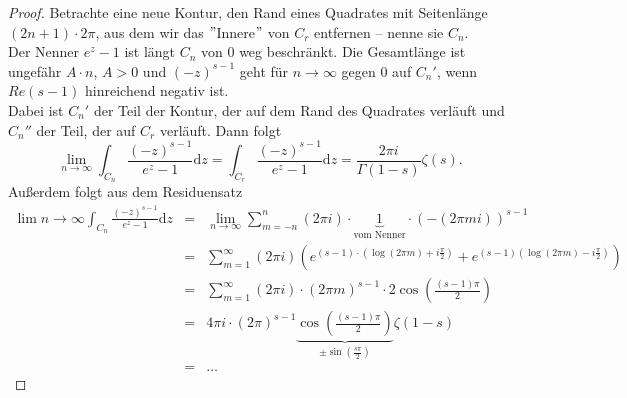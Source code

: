\documentclass[11pt,titlepage]{article}
\theoremstyle{definition}
\theoremstyle{remark}
\begin{document}
	\begin{proof}
		Betrachte eine neue Kontur, den Rand eines Quadrates mit Seitenlänge $(2n+1)\cdot 2\pi$, aus dem wir 
		das $"$Innere$"$ von $C_r$ entfernen – nenne sie $C_n$. \\
		Der Nenner $e^z -1$ ist längt $C_n$ von $0$ weg beschränkt. Die Gesamtlänge ist ungefähr 
		$A\cdot n$, $A>0$ und $(-z)^{s-1}$ geht für $n\to \infty$ gegen $0$ auf $C_n'$, wenn $Re(s-1)$ hinreichend 
		negativ ist. \\
		Dabei ist $C_n'$ der Teil der Kontur, der auf dem Rand des Quadrates verläuft und $C_n''$ der Teil, der 
		auf $C_r$ verläuft. Dann folgt
		\[\lim_{n\to\infty}\int_{C_n}\frac{(-z)^{s-1}}{e^z -1}\mathrm{d}z = \int_{C_r} \frac{ (-z)^{s-1}}{e^z -1}\mathrm{d}
		z = \frac{2\pi i}{\Gamma(1-s)}\zeta(s). \]
		Außerdem folgt aus dem Residuensatz
		\begin{eqnarray*}
			\lim{n\to\infty}\int_{C_n} \frac{(-z)^{s-1}}{e^z -1}\mathrm{d}z &=&\lim_{n\to\infty} \sum_{m=-n}^n (2\pi i)\cdot 
			\underbrace{1}_{\text{vom Nenner}} \cdot (-(2\pi mi))^{s-1} \\
			&=& \sum_{m=1}^{\infty} (2\pi i) \left( e^{(s-1)\cdot (\log(2\pi m)+i\frac{\pi}{2})}+e^{(s-1)(\log(2\pi m)-
			i\frac{\pi}{2})}\right) \\
			&=& \sum_{m=1}^{\infty} (2\pi i)\cdot (2\pi m)^{s-1} \cdot 2\cos\left( \frac{(s-1)\pi}{2}\right) \\
			&=& 4\pi i\cdot (2\pi)^{s-1} \underbrace{\cos\left(\frac{(s-1)\pi}{2}\right)}_{\pm\sin(\frac{s\pi}{2})} \zeta(1-s) \\
			&=& \ldots
		\end{eqnarray*}
	\end{proof}
	
\end{document}
